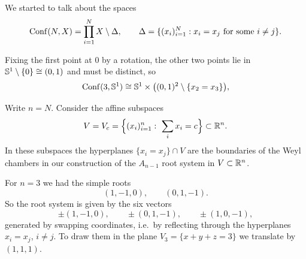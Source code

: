 We started to talk about the spaces
\[
  \operatorname{Conf}(N,X)=\prod_{i=1}^N X\setminus\Delta,
  \qquad
  \Delta=\{(x_i)_{i=1}^N: x_i=x_j \text{ for some } i\neq j\}.
\]

\begin{example}
\label{L07:ex:confS1}
Fixing the first point at $0$ by a rotation, the other two points lie in
$\mathbb{S}^1\setminus\{0\}\cong(0,1)$ and must be distinct, so
\[
  \operatorname{Conf}(3,\mathbb{S}^1)\cong \mathbb{S}^1\times\big((0,1)^2\setminus\{x_2=x_3\}\big),
\]
\end{example}

\begin{center}
\end{center}

\begin{example}
Write $n=N$. Consider the affine subspaces
\[
  V=V_c=\Big\{(x_i)_{i=1}^n:\ \sum_i x_i=c\Big\}\subset\mathbb{R}^n .
\]
In these subspaces the hyperplanes $\{x_i=x_j\}\cap V$ are the boundaries of the Weyl
chambers in our construction of the $A_{n-1}$ root system in $V\subset\mathbb{R}^n$.

For $n=3$ we had the simple roots
\[
  (1,-1,0),\qquad (0,1,-1).
\]
So the root system is given by the six vectors
\[
  \pm(1,-1,0),\qquad \pm(0,1,-1),\qquad \pm(1,0,-1),
\]
generated by swapping coordinates, i.e.\ by reflecting through the hyperplanes $x_i=x_j$,
$i\neq j$. To draw them in the plane $V_3=\{x+y+z=3\}$ we translate by $(1,1,1)$.
\end{example}

